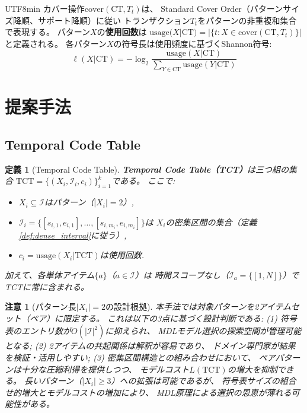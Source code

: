 \documentclass[11pt,a4paper]{article}
\newtheorem{definition}{定義}
\newtheorem{remark}{注意}
\begin{document}
\begin{CJK}{UTF8}{min}
カバー操作$\text{cover}(\text{CT}, T_t)$は、
Standard Cover Order（パターンサイズ降順、サポート降順）に従い
トランザクション$T_t$をパターンの非重複和集合で表現する。
パターン$X$の\textbf{使用回数}は
$\text{usage}(X|\text{CT}) = |\{t : X \in \text{cover}(\text{CT}, T_t)\}|$
と定義される。
各パターン$X$の符号長は使用頻度に基づくShannon符号:
\begin{equation}\label{eq:code_length}
  \ell(X | \text{CT}) = -\log_2 \frac{\text{usage}(X|\text{CT})}{\sum_{Y \in \text{CT}} \text{usage}(Y|\text{CT})}
\end{equation}


\section{提案手法}\label{sec:method}

\subsection{Temporal Code Table}

\begin{definition}[Temporal Code Table]\label{def:tct}
\textbf{Temporal Code Table（TCT）}は三つ組の集合
$\text{TCT} = \{(X_i, \mathcal{I}_i, c_i)\}_{i=1}^{k}$である。
ここで:
\begin{itemize}
  \item $X_i \subseteq \mathcal{I}$はパターン（$|X_i| = 2$）,
  \item $\mathcal{I}_i = \{[s_{i,1}, e_{i,1}], \ldots, [s_{i,m_i}, e_{i,m_i}]\}$は
    $X_i$の密集区間の集合（定義\ref{def:dense_interval}に従う）,
  \item $c_i = \text{usage}(X_i|\text{TCT})$は使用回数.
\end{itemize}
加えて、各単体アイテム$\{a\}$（$a \in \mathcal{I}$）は
時間スコープなし（$\mathcal{I}_a = \{[1,N]\}$）で
TCTに常に含まれる。
\end{definition}

\begin{remark}[パターン長$|X_i|=2$の設計根拠]\label{rem:L2}
本手法では対象パターンを2アイテムセット（ペア）に限定する。
これは以下の3点に基づく設計判断である:
(1) 符号表のエントリ数が$O(|\mathcal{I}|^2)$に抑えられ、
MDLモデル選択の探索空間が管理可能となる;
(2) 2アイテムの共起関係は解釈が容易であり、
ドメイン専門家が結果を検証・活用しやすい;
(3) 密集区間構造との組み合わせにおいて、
ペアパターンは十分な圧縮利得を提供しつつ、
モデルコスト$L(\text{TCT})$の増大を抑制できる。
長いパターン（$|X_i| \geq 3$）への拡張は可能であるが、
符号表サイズの組合せ的増大とモデルコストの増加により、
MDL原理による選択の恩恵が薄れる可能性がある。
\end{remark}


\end{CJK}
\end{document}

